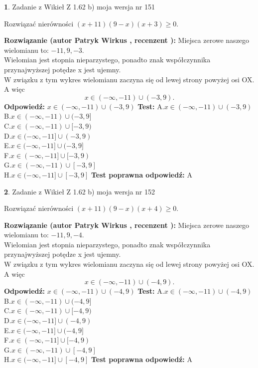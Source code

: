 \documentclass[12pt, a4paper]{article}
\theoremstyle{definition} %
\newtheorem{zad}{}
\newcommand{\zadStart}[1]{\begin{zad}#1\newline}
\newcommand{\zadStop}{\end{zad}}
\newcommand{\rozwStart}[2]{\noindent \textbf{Rozwiązanie (autor #1 , recenzent #2): }\newline}
\newcommand{\rozwStop}{\newline}
\newcommand{\odpStart}{\noindent \textbf{Odpowiedź:}\newline}
\newcommand{\odpStop}{\newline}
\newcommand{\testStart}{\noindent \textbf{Test:}\newline}
\newcommand{\testStop}{\newline}
\newcommand{\kluczStart}{\noindent \textbf{Test poprawna odpowiedź:}\newline}
\newcommand{\kluczStop}{\newline}
\begin{document}
\zadStart{Zadanie z Wikieł Z 1.62 b) moja wersja nr 151}

Rozwiązać nierówności $(x+11)(9-x)(x+3)\ge0$.
\zadStop
\rozwStart{Patryk Wirkus}{}
Miejsca zerowe naszego wielomianu to: $-11, 9, -3$.\\
Wielomian jest stopnia nieparzystego, ponadto znak współczynnika przy\linebreak najwyższej potędze x jest ujemny.\\ W związku z tym wykres wielomianu zaczyna się od lewej strony powyżej osi OX. A więc $$x \in (-\infty,-11) \cup (-3,9).$$
\rozwStop
\odpStart
$x \in (-\infty,-11) \cup (-3,9)$
\odpStop
\testStart
A.$x \in (-\infty,-11) \cup (-3,9)$\\
B.$x \in (-\infty,-11) \cup (-3,9]$\\
C.$x \in (-\infty,-11) \cup [-3,9)$\\
D.$x \in (-\infty,-11] \cup (-3,9)$\\
E.$x \in (-\infty,-11] \cup (-3,9]$\\
F.$x \in (-\infty,-11] \cup [-3,9)$\\
G.$x \in (-\infty,-11) \cup [-3,9]$\\
H.$x \in (-\infty,-11] \cup [-3,9]$
\testStop
\kluczStart
A
\kluczStop



\zadStart{Zadanie z Wikieł Z 1.62 b) moja wersja nr 152}

Rozwiązać nierówności $(x+11)(9-x)(x+4)\ge0$.
\zadStop
\rozwStart{Patryk Wirkus}{}
Miejsca zerowe naszego wielomianu to: $-11, 9, -4$.\\
Wielomian jest stopnia nieparzystego, ponadto znak współczynnika przy\linebreak najwyższej potędze x jest ujemny.\\ W związku z tym wykres wielomianu zaczyna się od lewej strony powyżej osi OX. A więc $$x \in (-\infty,-11) \cup (-4,9).$$
\rozwStop
\odpStart
$x \in (-\infty,-11) \cup (-4,9)$
\odpStop
\testStart
A.$x \in (-\infty,-11) \cup (-4,9)$\\
B.$x \in (-\infty,-11) \cup (-4,9]$\\
C.$x \in (-\infty,-11) \cup [-4,9)$\\
D.$x \in (-\infty,-11] \cup (-4,9)$\\
E.$x \in (-\infty,-11] \cup (-4,9]$\\
F.$x \in (-\infty,-11] \cup [-4,9)$\\
G.$x \in (-\infty,-11) \cup [-4,9]$\\
H.$x \in (-\infty,-11] \cup [-4,9]$
\testStop
\kluczStart
A
\kluczStop
\end{document}
